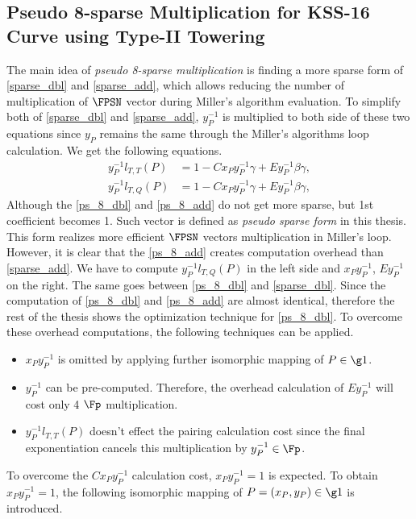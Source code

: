 \subsection{Pseudo 8-sparse Multiplication for KSS-16 Curve using Type-II Towering}
The main idea of  \textit{pseudo 8-sparse multiplication} is finding a more sparse form  of \eqref{sparse_dbl} and \eqref{sparse_add}, which allows reducing the number of multiplication of $\FPSN$ vector during Miller's algorithm evaluation. 
To simplify both of \eqref{sparse_dbl} and \eqref{sparse_add}, $y_P^{-1}$ is multiplied to both side of  these two equations since $y_P$  remains the same through the Miller's algorithms loop calculation.
We get the following equations.
\begin{subequations}
	\begin{eqnarray}
	y_{P}^{-1}l_{T,T}(P)& =  1 -Cx_{P}y_{P}^{-1}\gamma+E y_{P}^{-1}\beta\gamma ,  \label{ps_8_dbl}\\
	y_{P}^{-1}l_{T,Q}(P)& =  1 -Cx_{P}y_{P}^{-1}\gamma+E y_{P}^{-1}\beta\gamma , \label{ps_8_add}
	\end{eqnarray}
\end{subequations}
Although the \eqref{ps_8_dbl} and \eqref{ps_8_add} do not get more sparse, but 1st coefficient becomes 1. 
Such vector is defined as \textit{pseudo sparse form} in this thesis. 
This form realizes more efficient $\FPSN$ vectors  multiplication in Miller's loop.  
However, it is clear that the \eqref{ps_8_add} creates computation overhead than \eqref{sparse_add}. We have to compute $y_{P}^{-1}l_{T,Q}(P)$ in the left side and $x_Py_{P}^{-1}$, $Ey_P^{-1}$ on the right. 
The same goes between \eqref{ps_8_dbl} and \eqref{sparse_dbl}. 
Since the computation of \eqref{ps_8_dbl} and \eqref{ps_8_add} are almost identical, therefore the rest of the thesis shows the optimization technique for \eqref{ps_8_dbl}.
To overcome these overhead computations, the following techniques can be applied.
\begin{itemize}
	\item $x_{P}y_{P}^{-1}$ is omitted by applying further isomorphic mapping of $P \in \g1$.
	\item  $y_P^{-1} $ can be pre-computed. Therefore, the overhead calculation of $Ey_P^{-1}$ will cost only 4 $\Fp$ multiplication.
	\item  $y_{P}^{-1}l_{T,T}(P)$  doesn't effect the pairing calculation cost since the final exponentiation cancels this multiplication by $y_{P}^{-1} \in \Fp$.
\end{itemize}
To overcome the $Cx_{P}y_{P}^{-1}$  calculation cost, $x_{P}y_{P}^{-1} =1 $ is expected. 
To obtain $x_{P}y_{P}^{-1} = 1$, the following isomorphic mapping of $P=(x_P,y_P) \in \g1$ is introduced. 

